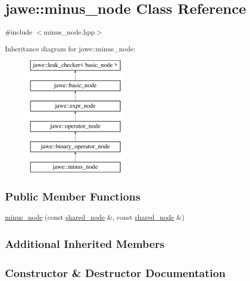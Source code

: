 \hypertarget{classjawe_1_1minus__node}{}\section{jawe\+:\+:minus\+\_\+node Class Reference}
\label{classjawe_1_1minus__node}


{\ttfamily \#include $<$minus\+\_\+node.\+hpp$>$}

Inheritance diagram for jawe\+:\+:minus\+\_\+node\+:\begin{figure}[H]
\begin{center}
\leavevmode
\includegraphics[height=6.000000cm]{classjawe_1_1minus__node}
\end{center}
\end{figure}
\subsection*{Public Member Functions}
\begin{DoxyCompactItemize}
\item 
\hyperlink{classjawe_1_1minus__node_ab6ecfbbcbefb29ef4614090fea1f93c3}{minus\+\_\+node} (const \hyperlink{namespacejawe_a3f307481d921b6cbb50cc8511fc2b544}{shared\+\_\+node} \&, const \hyperlink{namespacejawe_a3f307481d921b6cbb50cc8511fc2b544}{shared\+\_\+node} \&)
\end{DoxyCompactItemize}
\subsection*{Additional Inherited Members}


\subsection{Constructor \& Destructor Documentation}
\mbox{\label{classjawe_1_1minus__node_ab6ecfbbcbefb29ef4614090fea1f93c3}} 
